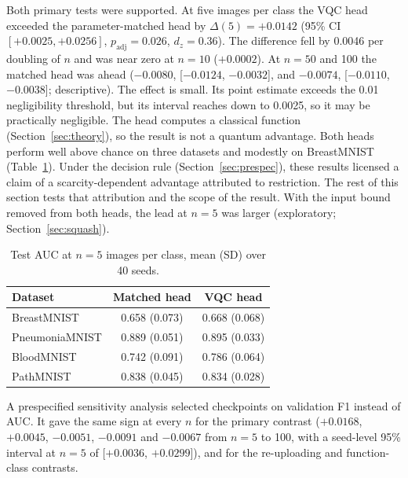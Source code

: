 \documentclass{ieeeaccess}
\newcommand{\vqc}{VQC}
\begin{document}
Both primary tests were supported. At five images per class the \vqc{} head exceeded the parameter-matched head by $\Delta(5)=+0.0142$ (95\% CI $[+0.0025,+0.0256]$, $p_{\mathrm{adj}}=0.026$, $d_z=0.36$). The difference fell by 0.0046 per doubling of $n$ and was near zero at $n=10$ ($+0.0002$). At $n=50$ and 100 the matched head was ahead ($-0.0080$, [$-0.0124$, $-0.0032$], and $-0.0074$, [$-0.0110$, $-0.0038$]; descriptive). The effect is small. Its point estimate exceeds the 0.01 negligibility threshold, but its interval reaches down to 0.0025, so it may be practically negligible. The head computes a classical function (Section~\ref{sec:theory}), so the result is not a quantum advantage. Both heads perform well above chance on three datasets and modestly on BreastMNIST (Table~\ref{tab:absauc}). Under the decision rule (Section~\ref{sec:prespec}), these results licensed a claim of a scarcity-dependent advantage attributed to restriction. The rest of this section tests that attribution and the scope of the result. With the input bound removed from both heads, the lead at $n=5$ was larger (exploratory; Section~\ref{sec:squash}).

\begin{table}[t]
\caption{Test AUC at $n=5$ images per class, mean (SD) over 40 seeds.}
\label{tab:absauc}
\centering
\footnotesize
\begin{tabular}{@{}lcc@{}}
\toprule
Dataset & Matched head & \vqc{} head\\
\midrule
BreastMNIST & 0.658 (0.073) & 0.668 (0.068)\\
PneumoniaMNIST & 0.889 (0.051) & 0.895 (0.033)\\
BloodMNIST & 0.742 (0.091) & 0.786 (0.064)\\
PathMNIST & 0.838 (0.045) & 0.834 (0.028)\\
\bottomrule
\end{tabular}
\end{table}

A prespecified sensitivity analysis selected checkpoints on validation F1 instead of AUC. It gave the same sign at every $n$ for the primary contrast ($+0.0168$, $+0.0045$, $-0.0051$, $-0.0091$ and $-0.0067$ from $n=5$ to 100, with a seed-level 95\% interval at $n=5$ of [$+0.0036$, $+0.0299$]), and for the re-uploading and function-class contrasts.
\end{document}
